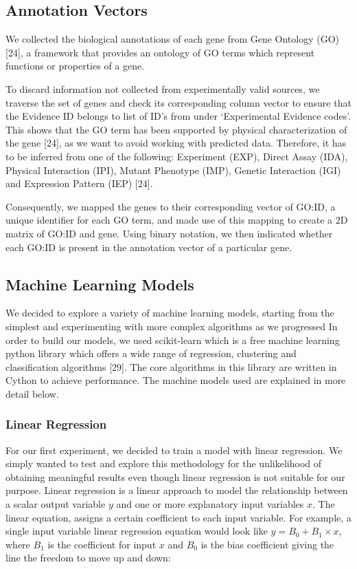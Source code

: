 \documentclass[9pt]{article}
\begin{document}
\subsection{Annotation Vectors}
We collected the biological annotations of each gene from Gene Ontology (GO) [24], a framework that provides an ontology of GO terms which represent functions or properties of a gene. 

To discard information not collected from experimentally valid sources, we traverse the set of genes and check its corresponding column vector to ensure that the Evidence ID belongs to list of ID’s from under ‘Experimental Evidence codes’. This shows that the GO term has been supported by physical characterization of the gene [24], as we want to avoid working with predicted data. Therefore, it has to be inferred from one of the following: Experiment (EXP), Direct Assay (IDA), Physical Interaction (IPI), Mutant Phenotype (IMP), Genetic Interaction (IGI) and Expression Pattern (IEP) [24].

Consequently, we mapped the genes to their corresponding vector of GO:ID, a unique identifier for each GO term, and made use of this mapping to create a 2D matrix of GO:ID and gene. Using binary notation, we then indicated whether each GO:ID is present in the annotation vector of a particular gene.


\subsection{Machine Learning Models}
We decided to explore a variety of machine learning models, starting from the simplest and experimenting with more complex algorithms as we progressed In order to build our models, we used scikit-learn which is a free machine learning python library which offers a wide range of regression, clustering and classification algorithms [29]. The core algorithms in this library are written in Cython to achieve performance. The machine models used are explained in more detail below. 

\subsubsection{Linear Regression}
For our first experiment, we decided to train a model with linear regression. We simply wanted to test and explore this methodology for the unlikelihood of obtaining meaningful results even though linear regression is not suitable for our purpose. Linear regression is a linear approach to model the relationship between a scalar output variable \(y\) and one or more explanatory input variables \(x\). The linear equation, assigns a certain coefficient to each input variable. For example, a single input variable linear regression equation would look like $y = B_0 + B_1\times{x}$, where \(B_1\) is the coefficient for input \(x\) and \(B_0\) is the bias coefficient giving the line the freedom to move up and down: 
\end{document}
